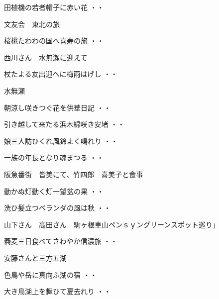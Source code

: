 \begin{shiika}田植機の若者帽子に赤い花
\hfill{・・}\end{shiika}
\vspace{0.6cm}
文友会　東北の旅
\begin{shiika}桜桃たわわの国へ喜寿の旅
\hfill{・・}\end{shiika}
\vspace{0.6cm}
西川さん　水無瀬に迎えて
\begin{shiika}杖たよる友出迎へに梅雨はげし
\hfill{・・}\end{shiika}
\vspace{0.6cm}
水無瀬
\begin{shiika}朝涼し咲きつぐ花を供華日記
\hfill{・・}\end{shiika}
\begin{shiika}引き越して来たる浜木綿咲き安堵
\hfill{・・}\end{shiika}
\begin{shiika}娘三人訪ひくれ風鈴よく鳴れり
\hfill{・・}\end{shiika}
\begin{shiika}一族の年長となり魂まつる
\hfill{・・}\end{shiika}
\vspace{0.6cm}
阪急番街　皆美にて、竹四郎　喜美子と食事
\begin{shiika}動かぬ灯動く灯一望盆の果
\hfill{・・}\end{shiika}
\begin{shiika}洗ひ髪立つベランダの風は秋
\hfill{・・}\end{shiika}
\vspace{0.6cm}
山下さん　高田さん　駒ヶ根車山ペンｓｙングリーンスポット巡り」
\begin{shiika}蕎麦三日食べてさわやか信濃旅
\hfill{・・}\end{shiika}
\vspace{0.6cm}
安藤さんと三方五湖
\begin{shiika}色鳥や岳に真向ふ湖の宿
\hfill{・・}\end{shiika}
\begin{shiika}大き鳥湖上を舞ひて夏去れり
\hfill{・・}\end{shiika}
